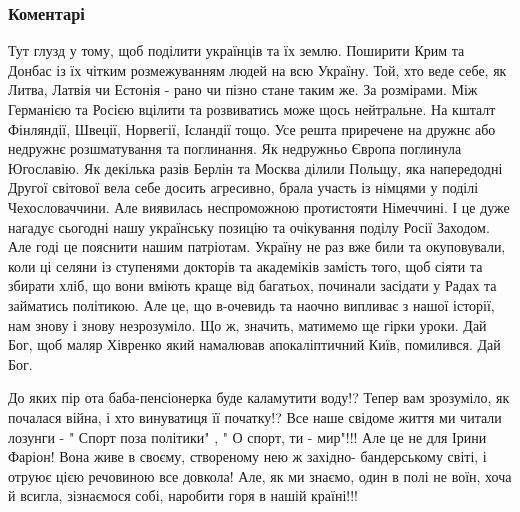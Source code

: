  
 
 
 
 
\subsubsection{Коментарі}

\begin{itemize}
 

Тут глузд у тому, щоб поділити українців та їх землю. Поширити Крим та Донбас
із їх чітким розмежуванням людей на всю Україну. Той, хто веде себе, як Литва,
Латвія чи Естонія - рано чи пізно стане таким же. За розмірами. Між Германією
та Росією вцілити та розвиватись може щось нейтральне. На кшталт Фінляндії,
Швеції, Норвегії, Ісландії тощо. Усе решта приречене на дружнє або недружнє
розшматування та поглинання. Як недружньо Європа поглинула Югославію. Як
декілька разів Берлін та Москва ділили Польщу, яка напередодні Другої світової
вела себе досить агресивно, брала участь із німцями у поділі Чехословаччини.
Але виявилась неспроможною протистояти Німеччині. І це дуже нагадує сьогодні
нашу українську позицію та очікування поділу Росії Заходом. Але годі це
пояснити нашим патріотам. Україну не раз вже били та окуповували, коли ці
селяни із ступенями докторів та академіків замість того, щоб сіяти та збирати
хліб, що вони вміють краще від багатьох, починали засідати у Радах та займатись
політикою. Але це, що в-очевидь та наочно випливає з нашої історії, нам знову і
знову незрозуміло. Що ж, значить, матимемо ще гірки уроки. Дай Бог, щоб маляр
Хівренко який намалював апокаліптичний Київ, помилився. Дай Бог.



До яких пір ота баба-пенсіонерка буде каламутити воду!? Тепер вам зрозуміло,
як почалася війна, і хто винуватиця її початку!? Все наше свідоме життя ми
читали лозунги - " Спорт поза політики" , " О спорт, ти - мир"!!! Але це не для
Ірини Фаріон! Вона живе в своєму, створеному нею ж західно- бандерському світі,
і отруює цією речовиною все довкола! Але, як ми знаємо, один в полі не воїн,
хоча й всигла, зізнаємося собі, наробити горя в нашій країні!!!


\end{itemize}
